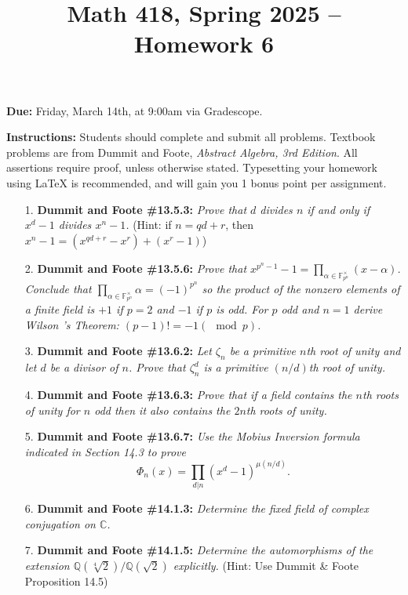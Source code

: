 \documentclass[12pt]{article}
\title{Math 418, Spring 2025 -- Homework 6}
\date{}
\newcommand{\Q}{\mathbb{Q}}
\newcommand{\C}{\mathbb{C}}
\newcommand{\F}{\mathbb{F}}
\begin{document}
 \maketitle
\vspace{-80pt}

\textbf{Due:} Friday, March 14th, at 9:00am via Gradescope.

\textbf{Instructions:} Students should complete and submit all problems. Textbook problems are from Dummit and Foote, \emph{Abstract Algebra, 3rd Edition}. All assertions require proof, unless otherwise stated. Typesetting your homework using LaTeX is recommended, and will gain you 1 bonus point per assignment.

\begin{enumerate}

\item[1.] \textbf{Dummit and Foote \#13.5.3:} \textit{Prove that $d$ divides $n$ if and only if $x^d - 1$ divides $x^n - 1$.} (Hint: if $n = qd+r$, then $x^n-1 = (x^{qd+r}-x^r) + (x^r-1)$)

\item[2.] \textbf{Dummit and Foote \#13.5.6:} \textit{Prove that $x^{p^n-1}-1 = \prod_{\alpha\in\F_{p^n}^\times} (x-\alpha)$. Conclude that $\prod_{\alpha\in\F_{p^n}^\times}\alpha = (-1)^{p^n}$ so the product of the nonzero elements of a finite field is $+1$ if $p = 2$ and $-1$ if $p$ is odd. For $p$ odd and $n = 1$ derive Wilson 's Theorem: $(p - 1)! = -1 (\mod p)$.}

\item[3.] \textbf{Dummit and Foote \#13.6.2:} \textit{Let $\zeta_n$ be a primitive $n$th root of unity and let $d$ be a divisor of $n$. Prove that $\zeta_n^d$ is a primitive $(n/d)$th root of unity.}

\item[4.] \textbf{Dummit and Foote \#13.6.3:}  \textit{Prove that if a field contains the $n$th roots of unity for $n$ odd then it also contains the $2n$th roots of unity.}

\item[5.] \textbf{Dummit and Foote \#13.6.7:}  \textit{Use the Mobius Inversion formula indicated in Section 14.3 to prove \[\Phi_n(x) = \prod_{d|n} (x^d-1)^{\mu(n/d)}.\]}

\item[6.] \textbf{Dummit and Foote \#14.1.3:}  \textit{Determine the fixed field of complex conjugation on $\C$.}

\item[7.] \textbf{Dummit and Foote \#14.1.5:}  \textit{Determine the automorphisms of the extension $\Q(\sqrt[4]{2})/\Q(\sqrt{2})$ explicitly.} (Hint: Use Dummit \& Foote Proposition 14.5)

\end{enumerate}
\end{document}
